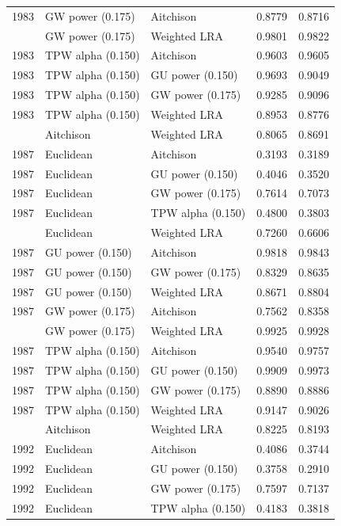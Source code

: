 \begin{longtable}[t]{rllrr}
1983 & GW power (0.175) & Aitchison & 0.8779 & 0.8716\\
\addlinespace
1983 & GW power (0.175) & Weighted LRA & 0.9801 & 0.9822\\
1983 & TPW alpha (0.150) & Aitchison & 0.9603 & 0.9605\\
1983 & TPW alpha (0.150) & GU power (0.150) & 0.9693 & 0.9049\\
1983 & TPW alpha (0.150) & GW power (0.175) & 0.9285 & 0.9096\\
1983 & TPW alpha (0.150) & Weighted LRA & 0.8953 & 0.8776\\
\addlinespace
1987 & Aitchison & Weighted LRA & 0.8065 & 0.8691\\
1987 & Euclidean & Aitchison & 0.3193 & 0.3189\\
1987 & Euclidean & GU power (0.150) & 0.4046 & 0.3520\\
1987 & Euclidean & GW power (0.175) & 0.7614 & 0.7073\\
1987 & Euclidean & TPW alpha (0.150) & 0.4800 & 0.3803\\
\addlinespace
1987 & Euclidean & Weighted LRA & 0.7260 & 0.6606\\
1987 & GU power (0.150) & Aitchison & 0.9818 & 0.9843\\
1987 & GU power (0.150) & GW power (0.175) & 0.8329 & 0.8635\\
1987 & GU power (0.150) & Weighted LRA & 0.8671 & 0.8804\\
1987 & GW power (0.175) & Aitchison & 0.7562 & 0.8358\\
\addlinespace
1987 & GW power (0.175) & Weighted LRA & 0.9925 & 0.9928\\
1987 & TPW alpha (0.150) & Aitchison & 0.9540 & 0.9757\\
1987 & TPW alpha (0.150) & GU power (0.150) & 0.9909 & 0.9973\\
1987 & TPW alpha (0.150) & GW power (0.175) & 0.8890 & 0.8886\\
1987 & TPW alpha (0.150) & Weighted LRA & 0.9147 & 0.9026\\
\addlinespace
1992 & Aitchison & Weighted LRA & 0.8225 & 0.8193\\
1992 & Euclidean & Aitchison & 0.4086 & 0.3744\\
1992 & Euclidean & GU power (0.150) & 0.3758 & 0.2910\\
1992 & Euclidean & GW power (0.175) & 0.7597 & 0.7137\\
1992 & Euclidean & TPW alpha (0.150) & 0.4183 & 0.3818\\

\end{longtable}
